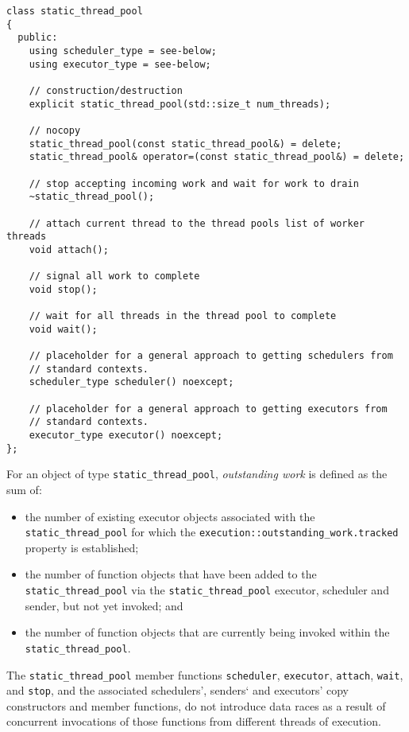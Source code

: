 \documentclass[a4paper,12pt,notitlepage,twoside,openright]{article}
\begin{document}
\begin{verbatim}
class static_thread_pool
{
  public:
    using scheduler_type = see-below;
    using executor_type = see-below;

    // construction/destruction
    explicit static_thread_pool(std::size_t num_threads);

    // nocopy
    static_thread_pool(const static_thread_pool&) = delete;
    static_thread_pool& operator=(const static_thread_pool&) = delete;

    // stop accepting incoming work and wait for work to drain
    ~static_thread_pool();

    // attach current thread to the thread pools list of worker threads
    void attach();

    // signal all work to complete
    void stop();

    // wait for all threads in the thread pool to complete
    void wait();

    // placeholder for a general approach to getting schedulers from
    // standard contexts.
    scheduler_type scheduler() noexcept;

    // placeholder for a general approach to getting executors from
    // standard contexts.
    executor_type executor() noexcept;
};
\end{verbatim}

For an object of type \texttt{static_thread_pool},
\emph{outstanding work} is defined as the sum of:

\begin{itemize}
\item
  the number of existing executor objects associated with the
  \texttt{static_thread_pool} for which the
  \texttt{execution::outstanding_work.tracked} property is
  established;
\item
  the number of function objects that have been added to the
  \texttt{static_thread_pool} via the
  \texttt{static_thread_pool} executor, scheduler and
  sender, but not yet invoked; and
\item
  the number of function objects that are currently being invoked within
  the \texttt{static_thread_pool}.
\end{itemize}

The \texttt{static_thread_pool} member functions
\texttt{scheduler}, \texttt{executor},
\texttt{attach}, \texttt{wait}, and
\texttt{stop}, and the associated schedulers', senders` and
executors' copy constructors and member functions, do not introduce data
races as a result of concurrent invocations of those functions from
different threads of execution.
\end{document}
